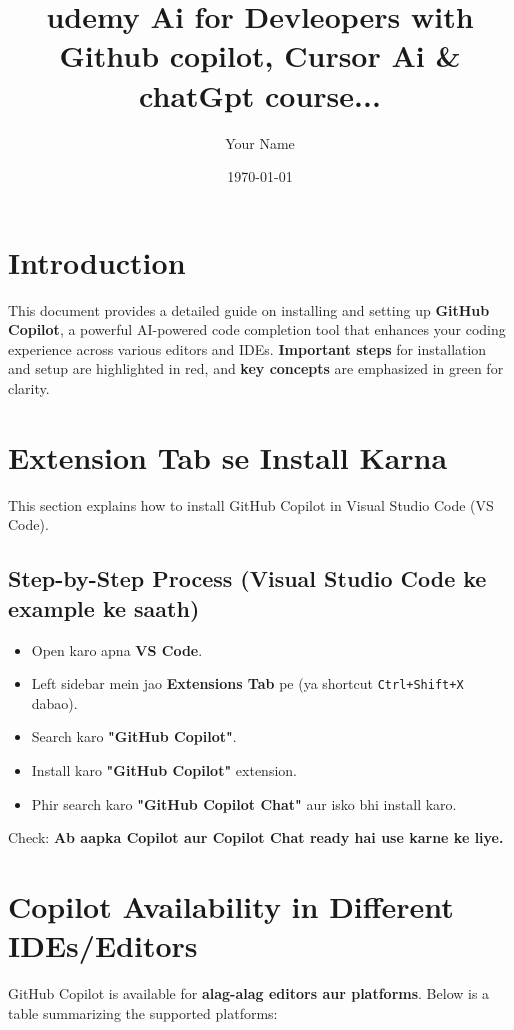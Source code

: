 \documentclass[a4paper, 12pt]{article}
\begin{document}
\title{\textbf{\color{sectionblue}udemy Ai for Devleopers with Github copilot, Cursor Ai & chatGpt course...}}
\author{Your Name}
\date{\today}
\maketitle

\section{Introduction}
This document provides a detailed guide on installing and setting up \textbf{\color{keyconceptgreen}GitHub Copilot}, a powerful AI-powered code completion tool that enhances your coding experience across various editors and IDEs. \textbf{\color{importantred}Important steps} for installation and setup are highlighted in red, and \textbf{\color{keyconceptgreen}key concepts} are emphasized in green for clarity.

\section{Extension Tab se Install Karna}
This section explains how to install GitHub Copilot in Visual Studio Code (VS Code).

\subsection{Step-by-Step Process (Visual Studio Code ke example ke saath)}
\begin{itemize}
    \item Open karo apna \textbf{VS Code}.
    \item Left sidebar mein jao \textbf{Extensions Tab} pe (ya shortcut \texttt{Ctrl+Shift+X} dabao).
    \item Search karo \textbf{\color{importantred}"GitHub Copilot"}.
    \item Install karo \textbf{\color{importantred}"GitHub Copilot"} extension.
    \item Phir search karo \textbf{\color{importantred}"GitHub Copilot Chat"} aur isko bhi install karo.
\end{itemize}
Check: \textbf{\color{keyconceptgreen}Ab aapka Copilot aur Copilot Chat ready hai use karne ke liye.}

\section{Copilot Availability in Different IDEs/Editors}
GitHub Copilot is available for \textbf{\color{keyconceptgreen}alag-alag editors aur platforms}. Below is a table summarizing the supported platforms:
\end{document}
